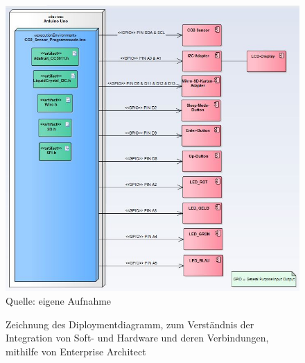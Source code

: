 \begin{figure}[!hbt]
	\centering
	\includegraphics[width=0.9\linewidth]{Images/Diploymentdiagramm_2}
	\footnotesize \\Quelle: eigene Aufnahme
	\caption{Zeichnung des Diploymentdiagramm, zum Verständnis der Integration von Soft- und Hardware und deren Verbindungen, mithilfe von Enterprise Architect}
	\label{fig:Diployment2}
\end{figure}